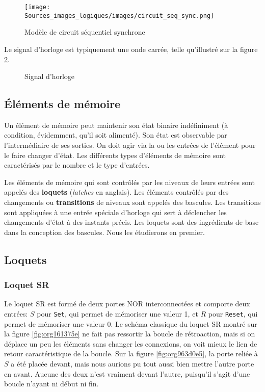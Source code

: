 \documentclass[11pt]{article}
\begin{document}
\begin{figure}[htbp]
\centering
\texttt{[image: Sources\_images\_logiques/images/circuit\_seq\_sync.png]}
\caption{\label{fig:org9ad1880}Modèle de circuit séquentiel synchrone}
\end{figure}

Le signal d'horloge est typiquement une onde carrée, telle
qu'illustré sur la figure \ref{fig:orgaa19481}.

\begin{figure}[htbp]
\centering

\caption{\label{fig:orgaa19481}Signal d'horloge}
\end{figure}

\subsection{Éléments de mémoire}
\label{sec:orgb0f53c3}

Un élément de mémoire peut maintenir son état binaire indéfiniment (à
condition, évidemment, qu'il soit alimenté). Son état est observable
par l'intermédiaire de ses sorties. On doit agir via la ou les entrées
de l'élément pour le faire changer d'état. Les différents types
d'éléments de mémoire sont caractérisés par le nombre et le type
d'entrées.

Les éléments de mémoire qui sont contrôlés par les niveaux de leurs
entrées sont appelés des \textbf{loquets} (\emph{latches} en anglais). Les
éléments contrôlés par des changements ou \textbf{transitions} de niveaux
sont appelés des bascules. Les transitions sont appliquées à une
entrée spéciale d'horloge qui sert à déclencher les changements d'état
à des instants précis. Les loquets sont des ingrédients de base dans
la conception des bascules. Nous les étudierons en premier.

\subsection{Loquets}
\label{sec:org23f2f7f}

\subsubsection{Loquet SR}
\label{sec:org128e209}

Le loquet SR est formé de deux portes NOR interconnectées et comporte
deux entrées: \(S\) pour \texttt{Set}, qui permet de mémoriser une valeur 1,
et \(R\) pour \texttt{Reset}, qui permet de mémoriser une valeur 0. Le schéma
classique du loquet SR montré sur la figure \ref{fig:org161375e} ne fait pas
ressortir la boucle de rétroaction, mais si on déplace un peu les
éléments sans changer les connexions, on voit mieux le lien de retour
caractéristique de la boucle. Sur la figure \ref{fig:org963d0e5}, la porte reliée
à \(S\) a été placée devant, mais nous aurions pu tout aussi bien
mettre l'autre porte en avant. Aucune des deux n'est vraiment devant
l'autre, puisqu'il s'agit d'une boucle n'ayant ni début ni fin.
\end{document}
